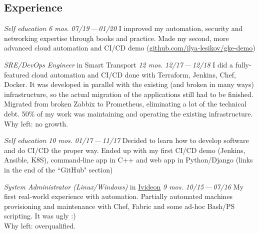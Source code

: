 \documentclass[11pt, a4paper]{article}
\newcommand{\Delimitline}{
  \vspace{-2ex}
  \noindent\makebox[\linewidth]{\rule{\DelimitlineLength}{0.12ex}} }
\newcommand{\forceindent}{\leavevmode{\parindent=1em\indent}}
\begin{document}
\subsection*{\vphantom{Professional Work }Experience}
\Delimitline

\begin{etaremune}[
  topsep=1ex,itemsep=1.5ex,partopsep=0ex,
  parsep=0ex,rightmargin=1em,leftmargin=2em
]
  \item
    \emph{Self education}\hfill
    \textit{6 mos.}\hspace{1.0em}
    \textit{07/19\,—\,01/20}\vspace{1.5ex}\newline
    \forceindent I improved my automation, security and networking expertise through books and practice. Made my second, more advanced cloud automation and CI/CD demo (\href{https://github.com/ilya-lesikov/gke-demo}{github.com/ilya-lesikov/gke-demo})

  \item
    \emph{SRE/DevOps Engineer}\hfill
    in Smart Transport\hspace{1.0em}
    \textit{12 mos.}\hspace{1.0em}
    \textit{12/17\,—\,12/18}\vspace{1.5ex}\newline
    \forceindent I did a fully-featured cloud automation and CI/CD done with Terraform, Jenkins, Chef, Docker. It was developed in parallel with the existing (and broken in many ways) infrastructure, so the actual migration of the applications still had to be finished. Migrated from broken Zabbix to Prometheus, eliminating a lot of the technical debt. 50\% of my work was maintaining and operating the existing infrastructure.\\[0.7ex]
    \forceindent Why left: no growth.

\newpage

  \item
    \emph{Self education}\hfill
    \textit{10 mos.}\hspace{1.0em}
    \textit{01/17\,—\,11/17}\vspace{1.5ex}\newline
    \forceindent Decided to learn how to develop software and do CI/CD the proper way. Ended up with my first CI/CD demo (Jenkins, Ansible, K8S), command-line app in C++ and web app in Python/Django (links in the end of the ``GitHub" section)

  \item
    \emph{System Administrator (Linux/Windows)}\hfill
    in \href{https://ivideon.com}{Ivideon}\hspace{1.0em}
    \textit{9 mos.}\hspace{1.0em}
    \textit{10/15\,—\,07/16}\vspace{1.5ex}\newline
    \forceindent My first real-world experience with automation. Partially automated machines provisioning and maintenance with Chef, Fabric and some ad-hoc Bash/PS scripting. It was ugly :)\\[0.7ex]
    \forceindent Why left: overqualified.


\end{etaremune}
\end{document}
